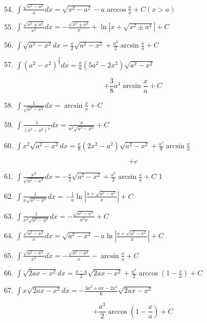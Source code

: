 \documentclass[lang=cn,newtx,12pt,scheme=chinese]{elegantbook}
\begin{document}
54. \(\int \frac{\sqrt{{x}^{2} - {a}^{2}}}{x}{dx} = \sqrt{{x}^{2} - {a}^{2}} - a\arccos \frac{a}{x} + C\left( {x > a}\right)\)

55. \(\int \frac{\sqrt{{x}^{2} \pm {a}^{2}}}{{x}^{2}}{dx} = - \frac{\sqrt{{x}^{2} \pm {a}^{2}}}{x} + \ln \left| {x + \sqrt{{x}^{2} \pm {a}^{2}}}\right| + C\)

56. \(\int \sqrt{{a}^{2} - {x}^{2}}{dx} = \frac{x}{2}\sqrt{{a}^{2} - {x}^{2}} + \frac{{a}^{2}}{2}\arcsin \frac{x}{a} + C\)

57. \(\int {\left( {a}^{2} - {x}^{2}\right) }^{\frac{3}{2}}{dx} = \frac{x}{8}\left( {5{a}^{2} - 2{x}^{2}}\right) \sqrt{{a}^{2} - {x}^{2}}\)

\[
+ \frac{3}{8}{a}^{4}\arcsin \frac{x}{a} + C
\]

58. \(\int \frac{1}{\sqrt{{a}^{2} - {x}^{2}}}{dx} = \arcsin \frac{x}{a} + C\)

59. \(\int \frac{1}{{\left( {a}^{2} - {x}^{2}\right) }^{\frac{3}{2}}}{dx} = \frac{x}{{a}^{2}\sqrt{{a}^{2} - {x}^{2}}} + C\)

60. \(\int {x}^{2}\sqrt{{a}^{2} - {x}^{2}}{dx} = \frac{x}{8}\left( {2{x}^{2} - {a}^{2}}\right) \sqrt{{a}^{2} - {x}^{2}} + \frac{{a}^{4}}{8}\arcsin \frac{x}{a}\)

\[
+ c
\]

61. \(\int \frac{{x}^{2}}{\sqrt{{a}^{2} - {x}^{2}}}{dx} = - \frac{x}{2}\sqrt{{a}^{2} - {x}^{2}} + \frac{{a}^{2}}{2}\arcsin \frac{x}{a} + C\) 1

62. \(\int \frac{1}{x\sqrt{{a}^{2} - {x}^{2}}}{dx} = - \frac{1}{a}\ln \left| \frac{a + \sqrt{{a}^{2} - {x}^{2}}}{x}\right| + C\)

63. \(\int \frac{1}{{x}^{2}\sqrt{{a}^{2} - {x}^{2}}}{dx} = - \frac{\sqrt{{a}^{2} - {x}^{2}}}{{a}^{2}x} + C\)

64. \(\int \frac{\sqrt{{a}^{2} - {x}^{2}}}{x}{dx} = \sqrt{{a}^{2} - {x}^{2}} - a\ln \left| \frac{a + \sqrt{{a}^{2} - {x}^{2}}}{x}\right| + C\)

65. \(\int \frac{\sqrt{{a}^{2} - {x}^{2}}}{{x}^{2}}{dx} = - \frac{\sqrt{{a}^{2} - {x}^{2}}}{x} - \arcsin \frac{x}{a} + C\)

66. \(\int \sqrt{{2ax} - {x}^{2}}{dx} = \frac{x - a}{2}\sqrt{{2ax} - {x}^{2}} + \frac{{a}^{2}}{2}\arccos \left( {1 - \frac{x}{a}}\right) + C\)

67. \(\int x\sqrt{{2ax} - {x}^{2}}{dx} = - \frac{3{a}^{2} + {ax} - 2{x}^{2}}{6}\sqrt{{2ax} - {x}^{2}}\)

\[
+ \frac{{a}^{3}}{2}\arccos \left( {1 - \frac{x}{a}}\right) + C
\]
\end{document}
